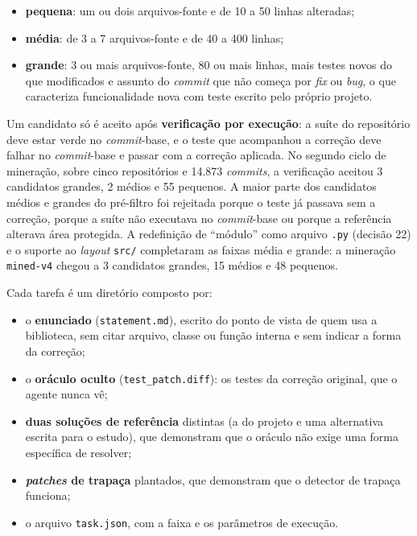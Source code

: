 \begin{itemize}
    \item \textbf{pequena}: um ou dois arquivos-fonte e de 10 a 50 linhas alteradas;
    \item \textbf{média}: de 3 a 7 arquivos-fonte e de 40 a 400 linhas;
    \item \textbf{grande}: 3 ou mais arquivos-fonte, 80 ou mais linhas, mais testes novos do que modificados e assunto do \textit{commit} que não começa por \textit{fix} ou \textit{bug}, o que caracteriza funcionalidade nova com teste escrito pelo próprio projeto.
\end{itemize}

Um candidato só é aceito após \textbf{verificação por execução}: a suíte do repositório deve estar verde no \textit{commit}-base, e o teste que acompanhou a correção deve falhar no \textit{commit}-base e passar com a correção aplicada. No segundo ciclo de mineração, sobre cinco repositórios e 14.873 \textit{commits}, a verificação aceitou 3 candidatos grandes, 2 médios e 55 pequenos.
 A maior parte dos candidatos médios e grandes do pré-filtro foi rejeitada porque o teste já passava sem a correção, porque a suíte não executava no \textit{commit}-base ou porque a referência alterava área protegida. A redefinição de ``módulo'' como arquivo \texttt{.py} (decisão 22) e o suporte ao \textit{layout} \texttt{src/} completaram as faixas média e grande: a mineração \texttt{mined-v4} chegou a 3 candidatos grandes, 15 médios e 48 pequenos.

Cada tarefa é um diretório composto por:

\begin{itemize}
    \item o \textbf{enunciado} (\texttt{statement.md}), escrito do ponto de vista de quem usa a biblioteca, sem citar arquivo, classe ou função interna e sem indicar a forma da correção;
    \item o \textbf{oráculo oculto} (\texttt{test\_patch.diff}): os testes da correção original, que o agente nunca vê;
    \item \textbf{duas soluções de referência} distintas (a do projeto e uma alternativa escrita para o estudo), que demonstram que o oráculo não exige uma forma específica de resolver;
    \item \textbf{\textit{patches} de trapaça} plantados, que demonstram que o detector de trapaça funciona;
    \item o arquivo \texttt{task.json}, com a faixa e os parâmetros de execução.
\end{itemize}

